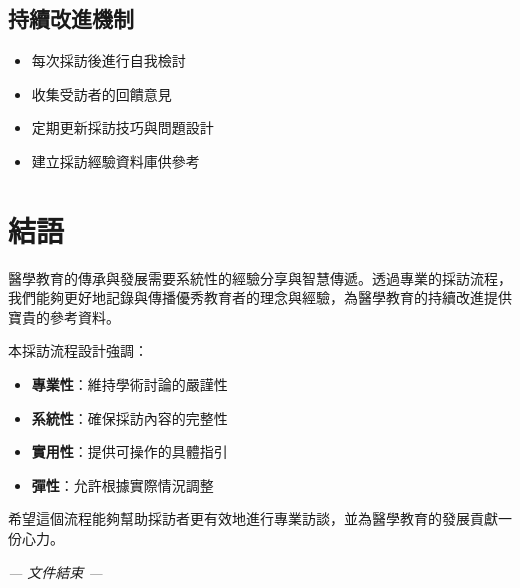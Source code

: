 \documentclass[12pt,a4paper]{article}
\begin{document}
\subsection{持續改進機制}
\begin{itemize}[nosep]
    \item 每次採訪後進行自我檢討
    \item 收集受訪者的回饋意見
    \item 定期更新採訪技巧與問題設計
    \item 建立採訪經驗資料庫供參考
\end{itemize}


\section{結語}

醫學教育的傳承與發展需要系統性的經驗分享與智慧傳遞。透過專業的採訪流程，我們能夠更好地記錄與傳播優秀教育者的理念與經驗，為醫學教育的持續改進提供寶貴的參考資料。

本採訪流程設計強調：
\begin{itemize}[nosep]
    \item \textbf{專業性}：維持學術討論的嚴謹性
    \item \textbf{系統性}：確保採訪內容的完整性
    \item \textbf{實用性}：提供可操作的具體指引
    \item \textbf{彈性}：允許根據實際情況調整
\end{itemize}

希望這個流程能夠幫助採訪者更有效地進行專業訪談，並為醫學教育的發展貢獻一份心力。

\vspace{1cm}
\begin{center}
\textcolor{interview_gray}{\textit{--- 文件結束 ---}}
\end{center}
\end{document}
